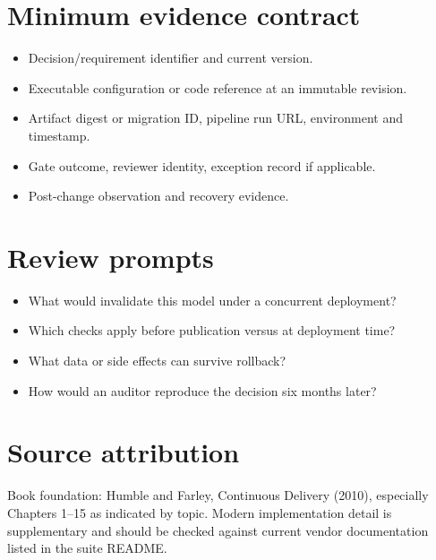 \documentclass[10pt,letterpaper]{article}
\begin{document}
\section{Minimum evidence contract}
\begin{itemize}
\item Decision/requirement identifier and current version.
\item Executable configuration or code reference at an immutable revision.
\item Artifact digest or migration ID, pipeline run URL, environment and timestamp.
\item Gate outcome, reviewer identity, exception record if applicable.
\item Post-change observation and recovery evidence.
\end{itemize}

\section{Review prompts}
\begin{itemize}
\item What would invalidate this model under a concurrent deployment?
\item Which checks apply before publication versus at deployment time?
\item What data or side effects can survive rollback?
\item How would an auditor reproduce the decision six months later?
\end{itemize}

\section{Source attribution}
Book foundation: Humble and Farley, Continuous Delivery (2010), especially Chapters 1--15 as indicated by topic. Modern implementation detail is supplementary and should be checked against current vendor documentation listed in the suite README.
\end{document}
